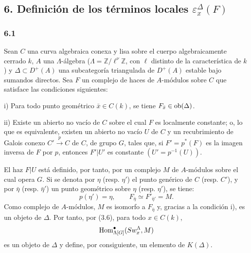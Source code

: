 \subsection*{6. Definición de los términos locales $\varepsilon_x^\Delta(F)$}

\subsubsection*{6.1}

Sean $C$ una curva algebraica conexa y lisa sobre el cuerpo algebraicamente cerrado $k$, $A$ una $\Lambda$-álgebra ($\Lambda=\mathbb Z/\ell^\nu\mathbb Z$, con $\ell$ distinto de la característica de $k$) y $\Delta\subset D^+(A)$ una subcategoría triangulada de $D^+(A)$ estable bajo sumandos directos. Sea $F$ un complejo de haces de $A$-módulos sobre $C$ que satisface las condiciones siguientes:

i) Para todo punto geométrico $\bar x\in C(k)$, se tiene $F_{\bar x}\in\operatorname{ob}(\Delta)$.

ii) Existe un abierto no vacío de $C$ sobre el cual $F$ es localmente constante; o, lo que es equivalente, existen un abierto no vacío $U$ de $C$ y un recubrimiento de Galois conexo $C'\xrightarrow{p}C$ de $C$, de grupo $G$, tales que, si $F'=p^*(F)$ es la imagen inversa de $F$ por $p$, entonces $F'|U'$ es constante $(U'=p^{-1}(U))$.

El haz $F|U$ está definido, por tanto, por un complejo $M$ de $A$-módulos sobre el cual opera $G$. Si se denota por $\eta$ (resp. $\eta'$) el punto genérico de $C$ (resp. $C'$), y por $\bar\eta$ (resp. $\bar\eta'$) un punto geométrico sobre $\eta$ (resp. $\eta'$), se tiene:
\[
p(\eta')=\eta,\qquad
F_{\bar\eta}\simeq F'_{\bar\eta'}=M.
\tag{6.1.1}
\]
Como complejo de $A$-módulos, $M$ es isomorfo a $F_{\bar\eta}$ y, gracias a la condición i), es un objeto de $\Delta$. Por tanto, por (3.6), para todo $x\in C(k)$,
\[
\operatorname{Hom}^\bullet_{\Lambda[G]}(Sw_x^\Lambda,M)
\]
es un objeto de $\Delta$ y define, por consiguiente, un elemento de $K(\Delta)$.

